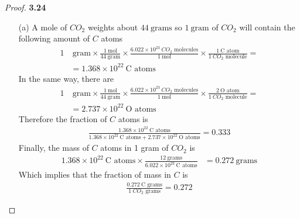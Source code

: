 \documentclass[11pt]{article}
\theoremstyle{definition}
\begin{document}
\begin{proof}{\textbf{3.24}}
    \begin{itemize}
        \item [(a)] A mole of $CO_2$ weights about
        $44~\text{grams}$ so $1~\text{gram}$ of $CO_2$ will contain
        the following amount of $C$ atoms
        \begin{align*}
            1&~\text{gram} \times \frac{1~\text{mol}}{44~\text{gram}}
            \times \frac{6.022\times 10^{23}~CO_2\text{ molecules}}{1~\text{mol}}
            \times \frac{1~\text{C atom}}{1~CO_2\text{ molecule}} =\\
            &= 1.368\times 10^{22}~\text{C atoms}
        \end{align*}
        In the same way, there are 
        \begin{align*}
            1&~\text{gram} \times \frac{1~\text{mol}}{44~\text{gram}}
            \times \frac{6.022\times 10^{23}~CO_2\text{ molecules}}{1~\text{mol}}
            \times \frac{2~\text{O atom}}{1~CO_2\text{ molecule}} =\\
            &= 2.737\times 10^{22}~\text{O atoms}
        \end{align*}
        Therefore the fraction of $C$ atoms is
        \begin{align*}
            \frac
            {1.368\times 10^{22}~\text{C atoms}}
            {
                1.368\times 10^{22}~\text{C atoms}
                + 2.737\times 10^{22}~\text{O atoms}
            }
            = 0.333 
        \end{align*}
        Finally, the mass of $C$ atoms in 1 gram of $CO_2$ is
        \begin{align*}
            1.368\times 10^{22}~\text{C atoms}
            \times \frac{12~\text{grams}}{6.022\times 10^{23}~\text{C atoms}}
            &= 0.272~\text{grams}
        \end{align*}
        Which implies that the fraction of mass in $C$ is
        \begin{align*}
            \frac{0.272~\text{C grams}}{1~CO_2\text{ grams}} = 0.272
        \end{align*}


\end{itemize}
\end{proof}
\end{document}
